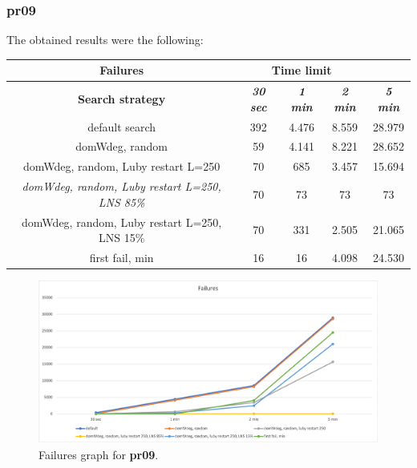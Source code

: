 \subsubsection{pr09}
The obtained results were the following:
{
\renewcommand{\arraystretch}{2}
\begin{longtable}[h]{| c | c | c | c | c |}
    \hline
    \textbf{Failures} & \multicolumn{3}{c}{Time limit} & \\
    \hline
    \textbf{Search strategy} & \textbf{\textit{30 sec}} & \textbf{\textit{1 min}} & \textbf{\textit{2 min}} & \textbf{\textit{5 min}} \\
    \hline
    \endhead
    default search                                         & 392 & 4.476 & 8.559 & 28.979 \\
    \hline
    domWdeg, random                                        &  59 & 4.141 & 8.221 & 28.652 \\
    \hline
    domWdeg, random, Luby restart L=250                    &  70 &  685 & 3.457 & 15.694 \\
    \hline
    \textit{domWdeg, random, Luby restart L=250, LNS 85\%} &  70 &   73 &   73 &    73 \\
    \hline
    domWdeg, random, Luby restart L=250, LNS 15\%          &  70 &  331 & 2.505 &  21.065 \\
    \hline
    first fail, min                                        &  16 &   16 & 4.098 &  24.530 \\
    \hline
\end{longtable}
}
\begin{figure}[H]
    \centering
    \includegraphics[width=0.8\columnwidth]{../graphs/pr09-failures.png}
    \caption{Failures graph for \textbf{pr09}.}
\end{figure}

